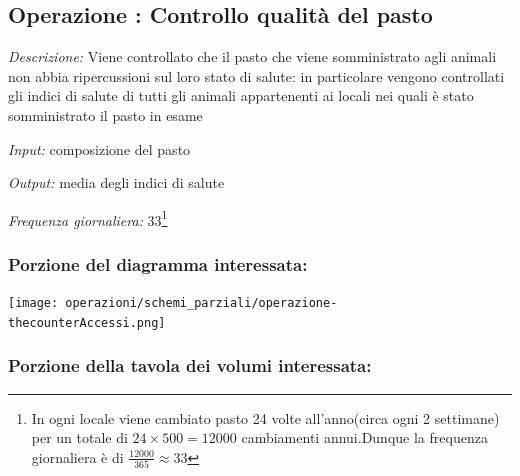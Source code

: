 \documentclass[12pt,a4paper]{article}
\begin{document}


\subsection*{Operazione \thecounterAccessi{}: Controllo qualità del pasto}
\noindent\textit{Descrizione:} Viene controllato che il pasto che viene somministrato agli animali non abbia ripercussioni sul loro stato di salute: in particolare vengono controllati gli indici di salute di tutti gli animali appartenenti ai locali nei quali è stato somministrato il pasto in esame

\noindent\textit{Input:} composizione del pasto

\noindent\textit{Output:} media degli indici di salute

\noindent\textit{Frequenza giornaliera:} 33\footnote{In ogni locale viene cambiato pasto 24 volte all'anno(circa ogni 2 settimane) per un totale di $24\times 500 = 12000$ cambiamenti annui.Dunque la frequenza giornaliera è di $\frac{12000}{365}\approx 33$}

\subsubsection*{Porzione del diagramma interessata:}



\texttt{[image: operazioni/schemi\_parziali/operazione-\\thecounterAccessi.png]} 
\subsubsection*{Porzione della tavola dei volumi interessata:}
\end{document}
